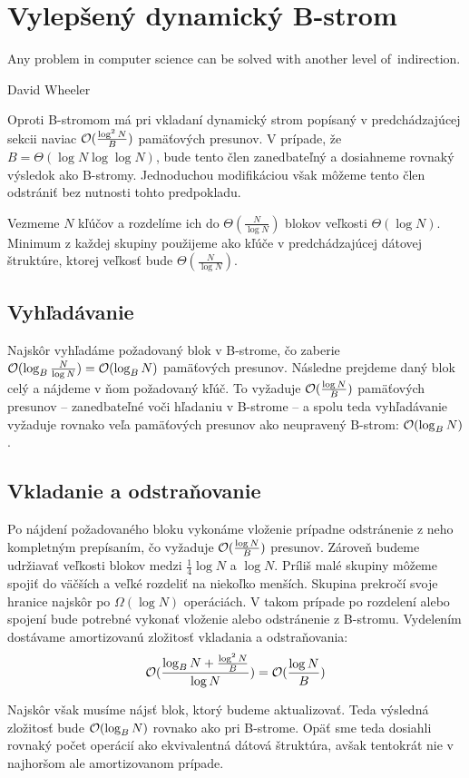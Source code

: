 \section{Vylepšený dynamický B-strom} \label{sec:dynamic-obliv-improved}
\epigraph{Any problem in computer science can be solved with another level of~indirection.}{David Wheeler}
Oproti \aware B-stromom má pri vkladaní \obliv dynamický strom popísaný v predchádzajúcej sekcii naviac $\mathcal{O}(\frac{\log^2{N}}{B})$ pamäťových presunov. V prípade, že $B=\Theta(\log{N}\log\log{N})$, bude tento člen zanedbateľný a dosiahneme rovnaký výsledok ako \aware B-stromy. Jednoduchou modifikáciou však môžeme tento člen odstrániť bez nutnosti tohto predpokladu.

Vezmeme $N$ kľúčov a rozdelíme ich do $\Theta(\frac{N}{\log{N}})$ blokov veľkosti $\Theta(\log{N})$. Minimum z každej skupiny použijeme ako kľúče v predchádzajúcej dátovej štruktúre, ktorej veľkosť bude $\Theta(\frac{N}{\log{N}})$.

\subsection{Vyhľadávanie}
Najskôr vyhľadáme požadovaný blok v B-strome, čo zaberie $\mathcal{O}(\log_B{\frac{N}{\log{N}}}) = \mathcal{O}(\log_B{N})$ pamäťových presunov. Následne prejdeme daný blok celý a nájdeme v ňom požadovaný kľúč. To vyžaduje $\mathcal{O}(\frac{\log{N}}{B})$ pamäťových presunov -- zanedbateľné voči hľadaniu v B-strome -- a spolu teda vyhľadávanie vyžaduje rovnako veľa pamäťových presunov ako neupravený B-strom: $\mathcal{O}(\log_B{N})$.

\subsection{Vkladanie a odstraňovanie}
Po nájdení požadovaného bloku vykonáme vloženie prípadne odstránenie z neho kompletným prepísaním, čo vyžaduje $\mathcal{O}(\frac{\log{N}}{B})$ presunov. Zároveň budeme udržiavať veľkosti blokov medzi $\frac{1}{4}\log{N}$ a $\log{N}$. Príliš malé skupiny môžeme spojiť do väčších a veľké rozdeliť na niekoľko menších. Skupina prekročí svoje hranice najskôr po $\Omega(\log{N})$ operáciách. V takom prípade po rozdelení alebo spojení bude potrebné vykonať vloženie alebo odstránenie z B-stromu. Vydelením dostávame amortizovanú zložitosť vkladania a odstraňovania:
\[
\mathcal{O}(\frac{\log_B{N} + \frac{\log^2{N}}{B}}{\log{N}}) = \mathcal{O}(\frac{\log{N}}{B})
\]

Najskôr však musíme nájsť blok, ktorý budeme aktualizovať. Teda výsledná zložitosť bude $\mathcal{O}(\log_B{N})$ rovnako ako pri \aware B-strome. Opäť sme teda dosiahli rovnaký počet operácií ako ekvivalentná \aware dátová štruktúra, avšak tentokrát nie v najhoršom ale  amortizovanom prípade.

